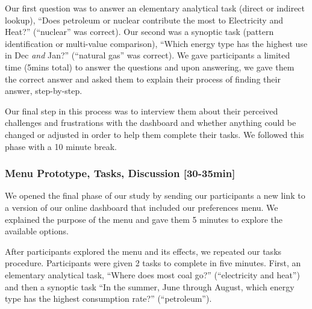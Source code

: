 \documentclass[12pt]{cmuthesis}
\begin{document}
Our first question was to answer an elementary analytical task (direct or indirect lookup), ``Does petroleum or nuclear contribute the most to Electricity and Heat?'' (``nuclear'' was correct). Our second was a synoptic task (pattern identification or multi-value comparison), ``Which energy type has the highest use in Dec \textit{and} Jan?'' (``natural gas'' was correct). We gave participants a limited time (5mins total) to answer the questions and upon answering, we gave them the correct answer and asked them to explain their process of finding their answer, step-by-step.

Our final step in this process was to interview them about their perceived challenges and frustrations with the dashboard and whether anything could be changed or adjusted in order to help them complete their tasks. We followed this phase with a 10 minute break.

\subsubsection{Menu Prototype, Tasks, Discussion [30-35min]}
We opened the final phase of our study by sending our participants a new link to a version of our online dashboard that included our preferences menu. We explained the purpose of the menu and gave them 5 minutes to explore the available options.

After participants explored the menu and its effects, we repeated our tasks procedure. Participants were given 2 tasks to complete in five minutes. First, an elementary analytical task, ``Where does most coal go?'' (``electricity and heat'') and then a synoptic task ``In the summer, June through August, which energy type has the highest consumption rate?'' (``petroleum'').
\end{document}
